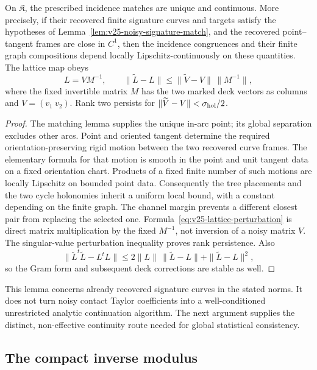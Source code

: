 \begin{lemma}
\label{lem:v24-gluing-persistence}
On \(\mathfrak K\), the prescribed incidence matches are unique and
continuous.  More precisely, if their recovered finite signature curves and
targets satisfy the hypotheses of
Lemma~\ref{lem:v25-noisy-signature-match}, and the recovered point--tangent
frames are close in \(C^1\), then the incidence congruences and their finite
graph compositions depend locally Lipschitz-continuously on these quantities.
The lattice map obeys
\begin{equation}\label{eq:v25-lattice-perturbation}
 L=VM^{-1},\qquad
 \|\widetilde L-L\|\le\|\widetilde V-V\|\,\|M^{-1}\|,
\end{equation}
where the fixed invertible matrix \(M\) has the two marked deck vectors as
columns and \(V=(v_1\ v_2)\).  Rank two persists for
\(\|\widetilde V-V\|<\sigma_{\rm hol}/2\).
\end{lemma}

\begin{proof}
The matching lemma supplies the unique in-arc point; its global separation
excludes other arcs.  Point and oriented tangent determine the required
orientation-preserving rigid motion between the two recovered curve frames.
The elementary formula for that motion is smooth in the point and unit
tangent data on a fixed orientation chart.  Products of a fixed finite
number of such motions are locally Lipschitz on bounded point data.
Consequently the tree placements and the two cycle holonomies inherit a
uniform local bound, with a constant depending on the finite graph.
The channel margin prevents a different closest pair from replacing the
selected one.  Formula~\eqref{eq:v25-lattice-perturbation} is direct matrix
multiplication by the fixed \(M^{-1}\), not inversion of a noisy matrix
\(V\).  The singular-value perturbation inequality proves rank persistence.
Also
\[
 \|\widetilde L^t\widetilde L-L^tL\|
 \le2\|L\|\,\|\widetilde L-L\|+\|\widetilde L-L\|^2,
\]
so the Gram form and subsequent deck corrections are stable as well.
\end{proof}

This lemma concerns already recovered signature curves in the stated
norms.  It does not turn noisy contact Taylor coefficients into a
well-conditioned unrestricted analytic continuation algorithm.  The next
argument supplies the distinct, non-effective continuity route needed for
global statistical consistency.

\subsection{The compact inverse modulus}

